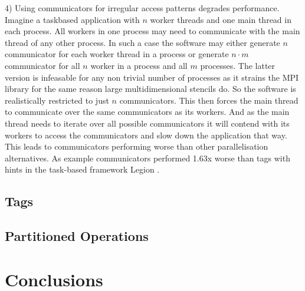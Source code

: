 \documentclass[sigconf]{acmart}
\begin{document}
4) Using communicators for irregular access patterns degrades performance.
Imagine a taskbased application with $n$ worker threads and one main thread in each process.
All workers in one process may need to communicate with the main thread of any other process.
In such a case the software may either generate $n$ communicator for each worker thread in a process or generate $n \cdot m$ communicator for all $n$ worker in a process and all $m$ processes.
The latter version is infeasable for any non trivial number of processes as it strains the MPI library for the same reason large multidimensional stencils do.
So the software is realistically restricted to just $n$ communicators.
This then forces the main thread to communicate over the same communicators as its workers.
And as the main thread needs to iterate over all possible communicators it will contend with its workers to access the communicators and slow down the application that way.
This leads to communicators performing worse than other parallelisation alternatives.
As example communicators performed 1.63x worse than tags with hints in the task-based framework Legion \cite{zambreLogicalParallel2021}.

\subsection{Tags}
\subsection{Partitioned Operations}


\section{Conclusions}


\end{document}
